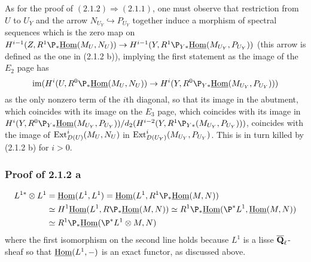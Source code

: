 \documentclass[deligne.tex]{subfiles}
\begin{document}
As for the proof of $(2.1.2)\Rightarrow(2.1.1)$, one must observe that
restriction from $U$ to $U_Y$ and the arrow $N_{U_Y}\hookrightarrow P_{U_Y}$
together induce a morphism of spectral sequences which is the zero map on
$H^{i-1}(Z,R^1\P_*\underline\Hom(M_U,N_U))\ra
H^{i-1}(Y,R^1\P_{Y*}\underline\Hom(M_{U_Y},P_{U_Y}))$
(this arrow is defined as the one in (2.1.2 b)),
implying the first statement as the image of the $E_2$ page has
\begin{equation*}
	\im(H^i(U,R^0\P_*\underline\Hom(M_U,N_U))\ra H^i(Y,R^0\P_{Y*}\underline\Hom(M_{U_Y},P_{U_Y})))
\end{equation*}
as the only nonzero term 
of the $i$th diagonal, so that its image in the abutment, which coincides 
with its image on the $E_3$ page, which coincides with its image in
$H^i(Y,R^0\P_{Y*}\underline\Hom(M_{U_Y},P_{U_Y}))/d_2(H^{i-2}(Y,R^1\P_{Y*}(M_{U_Y},P_{U_Y})))$,
coincides with the image of $\operatorname{Ext}^i_{D(U)}(M_U,N_U)$ in
$\operatorname{Ext}^i_{D(U_Y)}(M_{U_Y},P_{U_Y})$. This is in turn killed by (2.1.2 b)
for $i>0$.

\subsubsection*{Proof of 2.1.2 a}
\begin{align*}
	L^{1*}\otimes L^1
	&=\underline\Hom(L^1,L^1)
	=\underline\Hom(L^1,R^1\P_*\underline\Hom(M,N)) \\
	&\simeq H^1\underline\Hom(L^1,R\P_*\underline\Hom(M,N))
	\simeq R^1\P_*\underline\Hom(\P^*L^1,\underline\Hom(M,N)) \\
	&\simeq R^1\P_*\underline\Hom(\P^*L^1\otimes M,N)
\end{align*}
where the first isomorphism on the second line holds because
$L^1$ is a lisse $\overline{\mathbf{Q}}_\ell$-sheaf so that $\underline{\operatorname{Hom}}(L^1,-)$
is an exact functor, as discussed above.
\end{document}
